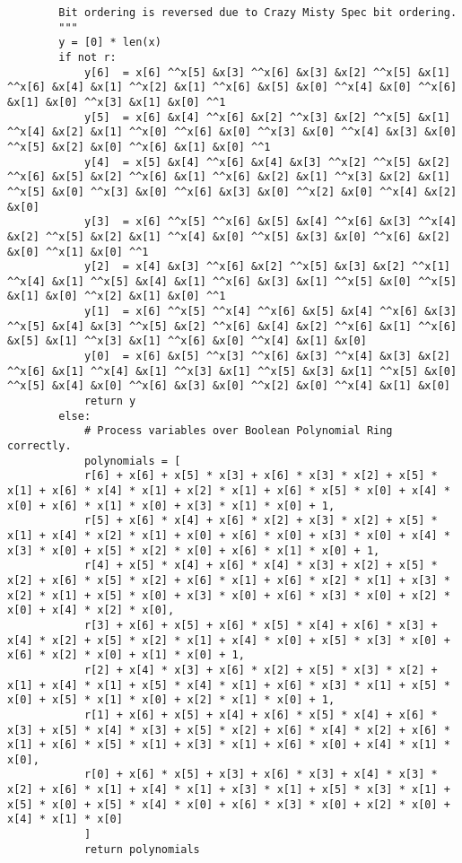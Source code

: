 \begin{lstlisting}
        Bit ordering is reversed due to Crazy Misty Spec bit ordering.
        """
        y = [0] * len(x)
        if not r:
            y[6]  = x[6] ^^x[5] &x[3] ^^x[6] &x[3] &x[2] ^^x[5] &x[1] ^^x[6] &x[4] &x[1] ^^x[2] &x[1] ^^x[6] &x[5] &x[0] ^^x[4] &x[0] ^^x[6] &x[1] &x[0] ^^x[3] &x[1] &x[0] ^^1
            y[5]  = x[6] &x[4] ^^x[6] &x[2] ^^x[3] &x[2] ^^x[5] &x[1] ^^x[4] &x[2] &x[1] ^^x[0] ^^x[6] &x[0] ^^x[3] &x[0] ^^x[4] &x[3] &x[0] ^^x[5] &x[2] &x[0] ^^x[6] &x[1] &x[0] ^^1
            y[4]  = x[5] &x[4] ^^x[6] &x[4] &x[3] ^^x[2] ^^x[5] &x[2] ^^x[6] &x[5] &x[2] ^^x[6] &x[1] ^^x[6] &x[2] &x[1] ^^x[3] &x[2] &x[1] ^^x[5] &x[0] ^^x[3] &x[0] ^^x[6] &x[3] &x[0] ^^x[2] &x[0] ^^x[4] &x[2] &x[0]
            y[3]  = x[6] ^^x[5] ^^x[6] &x[5] &x[4] ^^x[6] &x[3] ^^x[4] &x[2] ^^x[5] &x[2] &x[1] ^^x[4] &x[0] ^^x[5] &x[3] &x[0] ^^x[6] &x[2] &x[0] ^^x[1] &x[0] ^^1
            y[2]  = x[4] &x[3] ^^x[6] &x[2] ^^x[5] &x[3] &x[2] ^^x[1] ^^x[4] &x[1] ^^x[5] &x[4] &x[1] ^^x[6] &x[3] &x[1] ^^x[5] &x[0] ^^x[5] &x[1] &x[0] ^^x[2] &x[1] &x[0] ^^1
            y[1]  = x[6] ^^x[5] ^^x[4] ^^x[6] &x[5] &x[4] ^^x[6] &x[3] ^^x[5] &x[4] &x[3] ^^x[5] &x[2] ^^x[6] &x[4] &x[2] ^^x[6] &x[1] ^^x[6] &x[5] &x[1] ^^x[3] &x[1] ^^x[6] &x[0] ^^x[4] &x[1] &x[0]
            y[0]  = x[6] &x[5] ^^x[3] ^^x[6] &x[3] ^^x[4] &x[3] &x[2] ^^x[6] &x[1] ^^x[4] &x[1] ^^x[3] &x[1] ^^x[5] &x[3] &x[1] ^^x[5] &x[0] ^^x[5] &x[4] &x[0] ^^x[6] &x[3] &x[0] ^^x[2] &x[0] ^^x[4] &x[1] &x[0]
            return y
        else:
            # Process variables over Boolean Polynomial Ring correctly.
            polynomials = [
            r[6] + x[6] + x[5] * x[3] + x[6] * x[3] * x[2] + x[5] * x[1] + x[6] * x[4] * x[1] + x[2] * x[1] + x[6] * x[5] * x[0] + x[4] * x[0] + x[6] * x[1] * x[0] + x[3] * x[1] * x[0] + 1,
            r[5] + x[6] * x[4] + x[6] * x[2] + x[3] * x[2] + x[5] * x[1] + x[4] * x[2] * x[1] + x[0] + x[6] * x[0] + x[3] * x[0] + x[4] * x[3] * x[0] + x[5] * x[2] * x[0] + x[6] * x[1] * x[0] + 1,
            r[4] + x[5] * x[4] + x[6] * x[4] * x[3] + x[2] + x[5] * x[2] + x[6] * x[5] * x[2] + x[6] * x[1] + x[6] * x[2] * x[1] + x[3] * x[2] * x[1] + x[5] * x[0] + x[3] * x[0] + x[6] * x[3] * x[0] + x[2] * x[0] + x[4] * x[2] * x[0],
            r[3] + x[6] + x[5] + x[6] * x[5] * x[4] + x[6] * x[3] + x[4] * x[2] + x[5] * x[2] * x[1] + x[4] * x[0] + x[5] * x[3] * x[0] + x[6] * x[2] * x[0] + x[1] * x[0] + 1,
            r[2] + x[4] * x[3] + x[6] * x[2] + x[5] * x[3] * x[2] + x[1] + x[4] * x[1] + x[5] * x[4] * x[1] + x[6] * x[3] * x[1] + x[5] * x[0] + x[5] * x[1] * x[0] + x[2] * x[1] * x[0] + 1,
            r[1] + x[6] + x[5] + x[4] + x[6] * x[5] * x[4] + x[6] * x[3] + x[5] * x[4] * x[3] + x[5] * x[2] + x[6] * x[4] * x[2] + x[6] * x[1] + x[6] * x[5] * x[1] + x[3] * x[1] + x[6] * x[0] + x[4] * x[1] * x[0],
            r[0] + x[6] * x[5] + x[3] + x[6] * x[3] + x[4] * x[3] * x[2] + x[6] * x[1] + x[4] * x[1] + x[3] * x[1] + x[5] * x[3] * x[1] + x[5] * x[0] + x[5] * x[4] * x[0] + x[6] * x[3] * x[0] + x[2] * x[0] + x[4] * x[1] * x[0]
            ]
            return polynomials



\end{lstlisting}
